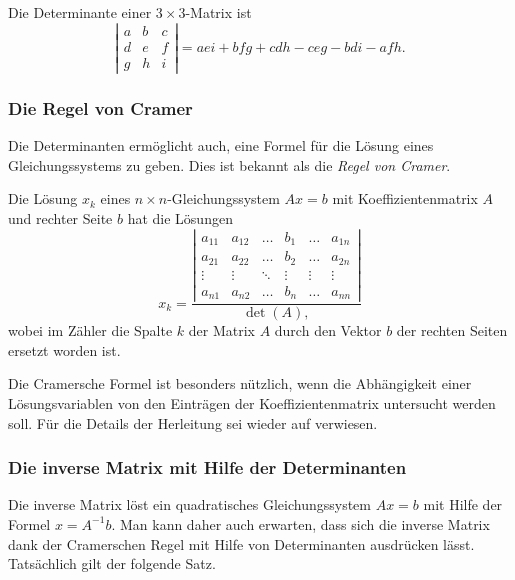 \begin{satz}[Sarrus]
\label{buch:linear:determinate:sarrus}
Die Determinante einer $3\times 3$-Matrix ist
\[
\left|\begin{matrix}
a&b&c\\
d&e&f\\
g&h&i
\end{matrix}\right|
=
aei + bfg + cdh - ceg - bdi - afh.
\]
\end{satz}

\subsubsection{Die Regel von Cramer}
Die Determinanten ermöglicht auch, eine Formel für die Lösung eines
Gleichungssystems zu geben.
Dies ist bekannt als die {\em Regel von Cramer}.
%
%
%

\begin{satz}
\label{buch:linear:determinante:cramer}
Die Lösung $x_k$ eines $n\times n$-Gleichungssystem $Ax=b$ mit
Koeffizientenmatrix $A$ und rechter Seite $b$ hat die Lösungen
\begin{equation}
x_k
=
\frac{
\left|\begin{matrix}
a_{11}&a_{12}&\dots &b_1   &\dots &a_{1n}\\
a_{21}&a_{22}&\dots &b_2   &\dots &a_{2n}\\
\vdots&\vdots&\ddots&\vdots&\vdots&\vdots\\
a_{n1}&a_{n2}&\dots &b_n   &\dots &a_{nn}
\end{matrix}\right|
}{
\det(A),
}
\end{equation}
wobei im Zähler die Spalte $k$ der Matrix $A$ durch den Vektor $b$
der rechten Seiten ersetzt worden ist.
\end{satz}

Die Cramersche Formel ist besonders nützlich, wenn die Abhängigkeit
einer Lösungsvariablen von den Einträgen der Koeffizientenmatrix
untersucht werden soll.
Für die Details der Herleitung sei wieder auf \cite{buch:linalg}
verwiesen.

\subsubsection{Die inverse Matrix mit Hilfe der Determinanten}
Die inverse Matrix löst ein quadratisches Gleichungssystem $Ax=b$ mit
Hilfe der Formel $x=A^{-1}b$.
Man kann daher auch erwarten, dass sich die inverse Matrix dank
der Cramerschen Regel mit Hilfe von Determinanten ausdrücken lässt.
Tatsächlich gilt der folgende Satz.

